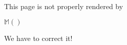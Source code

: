 \documentclass{article}
\begin{document}
This page is not properly rendered by {\ActiveDVI}

$\mathbb{M}()$

We have to correct it!
\end{document}
